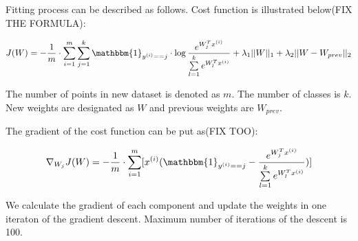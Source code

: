 Fitting process can be described as follows. Cost function is illustrated below(FIX THE FORMULA):

$$J(W) = -\frac{1}{m} \cdot \sum \limits_{i = 1}^{m} \sum \limits_{j = 1}^{k} \mathbbm{1}_{y^{(i)} == j} \cdot \log \frac{e^{W_{j}^Tx^{(i)}}}{\sum \limits_{l = 1}^{k}  e^{W_{l}^Tx^{(i)}}} + \lambda_1 ||W||_1 + \lambda_2 ||W - W_{prev}||_2 $$

The number of points in new dataset is denoted as $m$. The number of classes is $k$. New weights are designated as $W$ and previous weights are $W_{prev}$.

The gradient of the cost function can be put as(FIX TOO):

$$ \nabla_{W_j}  J(W) = -\frac{1}{m} \cdot \sum \limits_{i = 1}^{m} [ x^{(i)} ( \mathbbm{1}_{y^{(i)} == j} - \frac{e^{W_{j}^Tx^{(i)}}}{\sum \limits_{l = 1}^{k}  e^{W_{l}^Tx^{(i)}}} ) ] $$

We calculate the gradient of each component and update the weights in one iteraton of the gradient descent. Maximum number of iterations of the descent is 100.